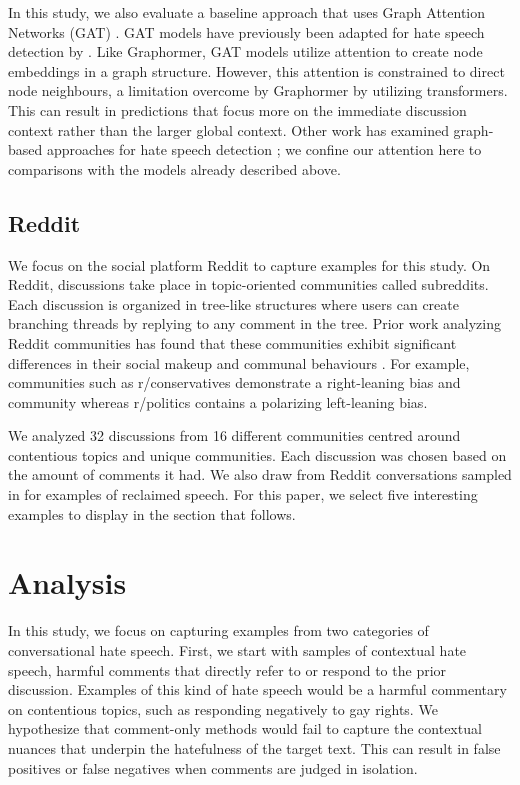 \documentclass[letterpaper]{article} %
\begin{document}
In this study, we also evaluate a baseline approach that uses Graph Attention Networks (GAT) \cite{velickovic2018graph}. GAT models have previously been adapted for hate speech detection by \citet{parmentier2019learning, parmentier2021}. Like Graphormer, GAT models utilize attention to create node embeddings in a graph structure. However, this attention is constrained to direct node neighbours, a limitation overcome by Graphormer by utilizing transformers. This can result in predictions that focus more on the immediate discussion context rather than the larger global context.  Other work has examined graph-based approaches for hate speech detection \cite{mishra-etal-2019-abusive, tian-etal-2022-duck}; we confine our attention here to comparisons with the models already described above.

\subsection{Reddit}
We focus on the social platform Reddit to capture examples for this study. On Reddit, discussions take place in topic-oriented communities called subreddits. Each discussion is organized in tree-like structures where users can create branching threads by replying to any comment in the tree. Prior work analyzing Reddit communities has found that these communities exhibit significant differences in their social makeup and communal behaviours \cite{Waller2021}. For example, communities such as r/conservatives demonstrate a right-leaning bias and community whereas r/politics contains a polarizing left-leaning bias.

We analyzed 32 discussions from 16 different communities centred around contentious topics and unique communities. Each discussion was chosen based on the amount of comments it had. We also draw from Reddit conversations sampled in \citet{kurrek2020towards} for examples of reclaimed speech. For this paper, we select five interesting examples to display in the section that follows.


\section{Analysis}
In this study, we focus on capturing examples from two categories of conversational hate speech. First, we start with samples of contextual hate speech, harmful comments that directly refer to or respond to the prior discussion. Examples of this kind of hate speech would be a harmful commentary on contentious topics, such as responding negatively to gay rights. We hypothesize that comment-only methods would fail to capture the contextual nuances that underpin the hatefulness of the target text. This can result in false positives or false negatives when comments are judged in isolation.
\end{document}
